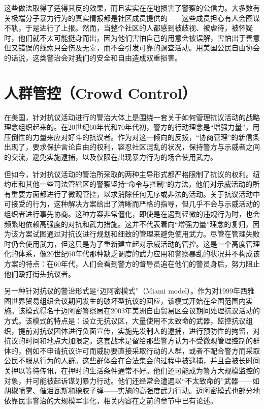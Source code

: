 \documentclass[fontset=fandol, a4paper, 12pt, openright]{ctexbook}
\begin{document}
这些做法取得了适得其反的效果，而且实实在在地损害了警察的公信力。大多数有关极端分子暴力行为的真实情报都是社区成员提供的——这些成员担心有人会图谋不轨，于是进行了上报。然而，当整个社区的人都感到被歧视、被虐待，被怀疑时，他们就不太可能挺身而出，因为他们害怕自己的用意会被误解，害怕出于善意但又错误的线索只会伤及无辜，而不会引发可靠的调查活动。用美国公民自由协会的话说，这类警治会对我们的安全和自由造成双重损害。

\section{人群管控（Crowd Control）}

在美国，针对抗议活动进行的警治大体上是围绕一套关于如何管理抗议活动的战略理念组织起来的。在20世纪60年代和70年代初，警方的行动理念是“增强力量”，用压倒性的力量来应对好斗的抗议者。作为对这一倾向的反拨，“协商管理”的新信条出现了，要求保护言论自由的权利，容忍社区混乱的状况，保持警方与示威者之间的交流，避免实施逮捕，以及仅限在出现暴力行为的场合使用武力。

但如今，针对抗议活动的警治所采取的两种主导形式都严格限制了抗议的权利。纽约市和其他一些司法管辖区的警察坚持“命令与控制”的方法，他们对示威活动的所有重要方面都进行了微观管控，以求消除任何无序或非法的活动。关于抗议活动中可接受的行为，这种解决方案给出了清晰而严格的指导，但几乎不会与示威活动的组织者进行事先协商。这种方案非常僵化，即使是在遇到轻微的违规行为时，也会频繁地依赖高强度的对抗和武力措施。这并不代表着向“增强力量”理念的复归，因为该方案试图通过对抗议进行规划和细致的管理来避免使用武力。尽管在管理失败时仍会使用武力，但这只是为了重新建立起对示威活动的管控。这是一个高度管理化的体系，像20世纪60年代那种缺乏调度的武力应用和警察暴乱的状况并不构成该方案的特点：在60年代，人们会看到警方的督导员追在他们的警员身后，努力阻止他们殴打街头抗议者。

另一种针对抗议的警治形式是“迈阿密模式”（Miami model）。作为对1999年西雅图世界贸易组织会议期间发生的破坏型抗议的回应，该模式开始在全国范围内实施。该模式得名于迈阿密警察局在2003年美洲自由贸易区会议期间处理抗议活动的方式。该模式的特点是：设立无抗议区，大量使用不太致命的武器，监控抗议组织，提前对抗议团体进行负面宣传，实施先发制人的逮捕，进行预防性的拘留，对抗议的时间和地点大加限定。这套战术是留给那些警方认为不受微观管理控制的群体的，例如不申请抗议许可而威胁要直接采取行动的人群，或者不配合警方而采取公民不服从行为的人群。这些群体会在合法集会的过程中被逮捕，并且会被长时间关押以等待传讯，在押时的生活条件通常不好。他们还可能成为警方大规模监控的对象，并可能被起诉谋划暴力行动。他们还经常会遭遇以“不太致命的”武器——如胡椒喷雾、催泪瓦斯和橡胶子弹——实施的高强度武力行动。迈阿密模式也部分地依靠民事警治的大规模军事化，相关内容在之前的章节中已有论述。
\end{document}
